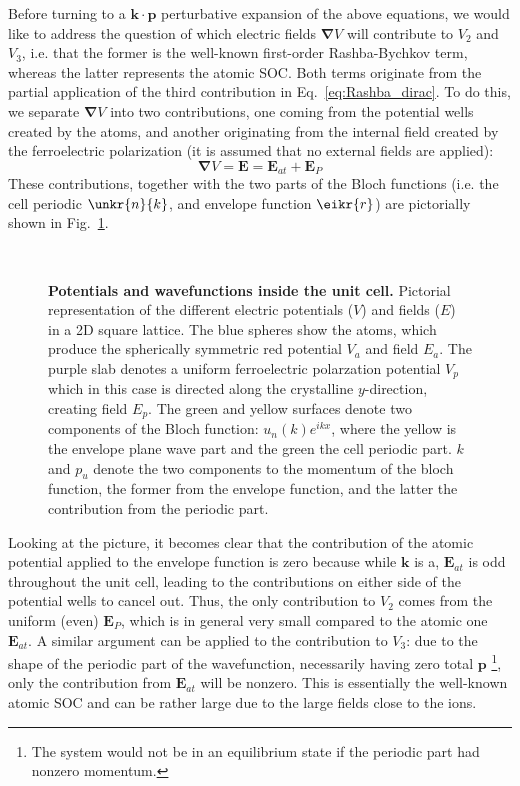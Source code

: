 Before turning to a $\bm{k} \cdot \bm{p}$ perturbative expansion of the above equations, we would like to address the question of which electric fields $\bm{\nabla}V$ will contribute to $V_2$ and $V_3$, i.e. that the former is the well-known first-order Rashba-Bychkov term, whereas the latter represents the atomic SOC.
Both terms originate from the partial application of the third contribution in Eq.~\ref{eq:Rashba_dirac}.
To do this, we separate $\bm{\nabla}V$ into two contributions, one coming from the potential wells created by the atoms, and another originating from the internal field created by the ferroelectric polarization (it is assumed that no external fields are applied):
\begin{equation}
	\bm{\nabla} V = \bm{E} = \bm{E}_{at} + \bm{E}_{P}
\end{equation}
These contributions, together with the two parts of the Bloch functions (i.e. the cell periodic $\unkr{n}{k}$, and envelope function $\eikr{r}$) are pictorially shown in Fig.~\ref{fig:Efield_cell_drawing}. 
\begin{figure}[h]
~\centering
{}\caption{\label{fig:Efield_cell_drawing}{\bf Potentials and wavefunctions inside the unit cell.} Pictorial representation of the different electric potentials ($V$) and fields ($E$) in a 2D square lattice. The blue spheres show the atoms, which produce the spherically symmetric red potential $V_a$ and field $E_a$. The purple slab denotes a uniform ferroelectric polarzation potential $V_p$ which in this case is directed along the crystalline $y$-direction, creating field $E_p$. The green and yellow surfaces denote two components of the Bloch function: $u_n(k) e^{ikx}$, where the yellow is the envelope plane wave part and the green the cell periodic part. $k$ and $p_u$ denote the two components to the momentum of the bloch function, the former from the envelope function, and the latter the contribution from the periodic part.}
\end{figure}

Looking at the picture, it becomes clear that the contribution of the atomic potential applied to the envelope function is zero because while $\bm{k}$ is a, $\bm{E}_{at}$ is odd throughout the unit cell, leading to the contributions on either side of the potential wells to cancel out.
Thus, the only contribution to $V_2$ comes from the uniform (even) $\bm{E}_P$, which is in general very small compared to the atomic one $\bm{E}_{at}$.
A similar argument can be applied to the contribution to $V_3$: due to the shape of the periodic part of the wavefunction, necessarily having zero total $\bm{p}$ \footnote{The system would not be in an equilibrium state if the periodic part had nonzero momentum.}, only the contribution from $\bm{E}_{at}$ will be nonzero.
This is essentially the well-known atomic SOC and can be rather large due to the large fields close to the ions. 

